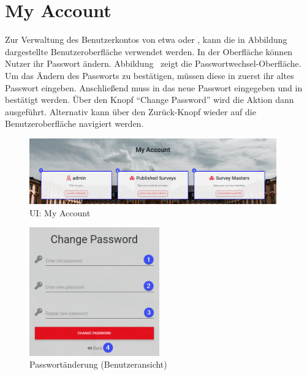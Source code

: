 \section{My Account}
\label{ssec:EigenerAccount}

Zur Verwaltung des Benutzerkontos von etwa \dutzi oder \ariane, kann die in Abbildung~ dargestellte Benutzeroberfläche verwendet werden.
In der Oberfläche können Nutzer \ua ihr Passwort ändern.
Abbildung~ zeigt die Passwortwechsel-Oberfläche.
Um das Ändern des Passworts zu bestätigen, müssen diese in \desOne zuerst ihr altes Passwort eingeben.
Anschließend muss in \desTwo das neue Passwort eingegeben und in \desThree bestätigt werden.
Über den Knopf \enquote{Change Password} wird die Aktion dann ausgeführt.
Alternativ kann über den Zurück-Knopf \desFour wieder auf die Benutzeroberfläche navigiert werden.
% 
\begin{figure}[H]
	\centering
	\includegraphics[width=0.95\textwidth, keepaspectratio]{img/guide/MyAccount.png}
	\captionsetup{justification=centering, format=plain}
	\caption[\acl{UI}: My Account]{\acl{UI}: My Account\\\quelleScreenshot}
	\label{fig:MyAccount}
\end{figure}
%
\begin{figure}[H]
	\centering
	\includegraphics[width=0.5\textwidth, keepaspectratio]{img/guide/ChangeOwnPassword.png}
	\captionsetup{justification=centering, format=plain}
	\caption[Eingabemaske: Passwortänderung (Benutzeransicht)]{Passwortänderung (Benutzeransicht)\\\quelleScreenshot}
	\label{fig:ChangeOwnPassword}
\end{figure}
% 
